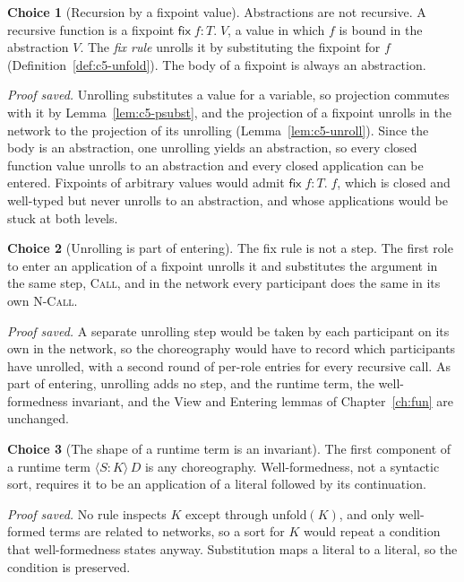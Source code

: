 \documentclass[11pt]{report}
\theoremstyle{plain}
\theoremstyle{definition}
\newtheorem{choice}{Choice}[chapter]
\theoremstyle{remark}
\newcommand{\kw}[1]{\mathsf{#1}}
\newcommand{\rt}[3]{\langle #1 : #2\rangle\,#3}
\newcommand{\unfold}[1]{\mathrm{unfold}(#1)}
\newcommand{\cfix}[3]{\kw{fix}\;#1{:}#2.\;#3}
\newcommand{\rn}[1]{{\normalfont\scshape #1}}
\begin{document}
\begin{choice}[Recursion by a fixpoint value]\label{cho:c5-fix}
  Abstractions are not recursive.  A recursive function is a fixpoint
  $\cfix{f}{T}{V}$, a value in which $f$ is bound in the abstraction $V$.
  The \emph{fix rule} unrolls it by substituting the fixpoint for $f$
  (Definition~\ref{def:c5-unfold}).  The body of a fixpoint is always an
  abstraction.

  \emph{Proof saved.}  Unrolling substitutes a value for a variable, so
  projection commutes with it by Lemma~\ref{lem:c5-psubst}, and the
  projection of a fixpoint unrolls in the network to the projection of its
  unrolling (Lemma~\ref{lem:c5-unroll}).  Since the body is an abstraction,
  one unrolling yields an abstraction, so every closed function value
  unrolls to an abstraction and every closed application can be entered.
  Fixpoints of arbitrary values would admit $\cfix{f}{T}{f}$, which is
  closed and well-typed but never unrolls to an abstraction, and whose
  applications would be stuck at both levels.
\end{choice}

\begin{choice}[Unrolling is part of entering]\label{cho:c5-enter}
  The fix rule is not a step.  The first role to enter an application of a
  fixpoint unrolls it and substitutes the argument in the same step,
  \rn{Call}, and in the network every participant does the same in its own
  \rn{N-Call}.

  \emph{Proof saved.}  A separate unrolling step would be taken by each
  participant on its own in the network, so the choreography would have to
  record which participants have unrolled, with a second round of per-role
  entries for every recursive call.  As part of entering, unrolling adds no
  step, and the runtime term, the well-formedness invariant, and the View and
  Entering lemmas of Chapter~\ref{ch:fun} are unchanged.
\end{choice}

\begin{choice}[The shape of a runtime term is an invariant]\label{cho:c5-rt}
  The first component of a runtime term $\rt{S}{K}{D}$ is any choreography.
  Well-formedness, not a syntactic sort, requires it to be an application of
  a literal followed by its continuation.

  \emph{Proof saved.}  No rule inspects $K$ except through $\unfold{K}$, and
  only well-formed terms are related to networks, so a sort for $K$ would
  repeat a condition that well-formedness states anyway.  Substitution maps
  a literal to a literal, so the condition is preserved.
\end{choice}
\end{document}
